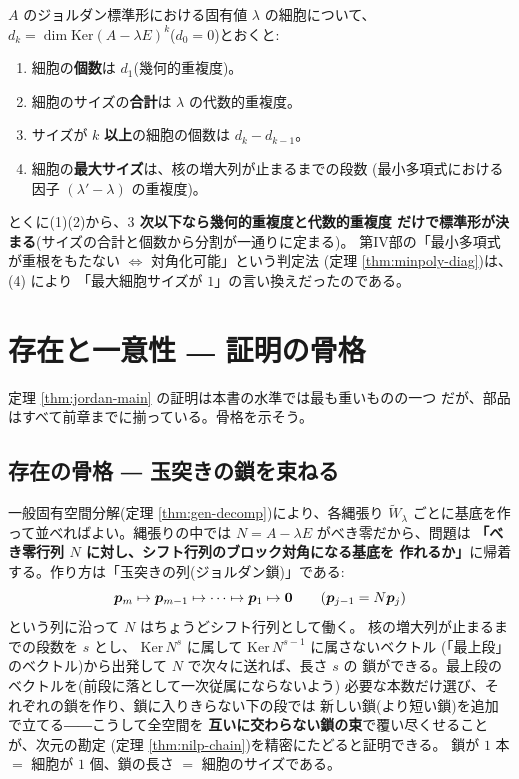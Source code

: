 \begin{teiri}[細胞の読み取り]\label{thm:jordan-count}
$A$ のジョルダン標準形における固有値 $\lambda$ の細胞について、
$d_k = \dim \mathrm{Ker}(A - \lambda E)^k$($d_0 = 0$)とおくと:
\begin{enumerate}
\item 細胞の\textbf{個数}は $d_1$(幾何的重複度)。
\item 細胞のサイズの\textbf{合計}は $\lambda$ の代数的重複度。
\item サイズが $k$ \textbf{以上}の細胞の個数は $d_k - d_{k-1}$。
\item 細胞の\textbf{最大サイズ}は、核の増大列が止まるまでの段数
(最小多項式における因子 $(\lambda' - \lambda)$ の重複度)。
\end{enumerate}
\end{teiri}

とくに(1)(2)から、\textbf{$3$ 次以下なら幾何的重複度と代数的重複度
だけで標準形が決まる}(サイズの合計と個数から分割が一通りに定まる)。
第IV部の「最小多項式が重根をもたない $\iff$ 対角化可能」という判定法
(定理 \ref{thm:minpoly-diag})は、(4) により
「最大細胞サイズが $1$」の言い換えだったのである。

\section{存在と一意性 ― 証明の骨格}

定理 \ref{thm:jordan-main} の証明は本書の水準では最も重いものの一つ
だが、部品はすべて前章までに揃っている。骨格を示そう。

\subsection*{存在の骨格 ― 玉突きの鎖を束ねる}

一般固有空間分解(定理 \ref{thm:gen-decomp})により、各縄張り
$\widetilde{W}_\lambda$ ごとに基底を作って並べればよい。縄張りの中では
$N = A - \lambda E$ がべき零だから、問題は
\textbf{「べき零行列 $N$ に対し、シフト行列のブロック対角になる基底を
作れるか」}に帰着する。作り方は「玉突きの列(ジョルダン鎖)」である:
\[
\bm{p}_m \mapsto \bm{p}_{m-1} \mapsto \cdots \mapsto \bm{p}_1 \mapsto \bm{0}
\qquad (\bm{p}_{j-1} = N\bm{p}_j)
\]
という列に沿って $N$ はちょうどシフト行列として働く。
核の増大列が止まるまでの段数を $s$ とし、
$\mathrm{Ker}\,N^s$ に属して $\mathrm{Ker}\,N^{s-1}$ に属さないベクトル
(「最上段」のベクトル)から出発して $N$ で次々に送れば、長さ $s$ の
鎖ができる。最上段のベクトルを(前段に落として一次従属にならないよう)
必要な本数だけ選び、それぞれの鎖を作り、鎖に入りきらない下の段では
新しい鎖(より短い鎖)を追加で立てる――こうして全空間を
\textbf{互いに交わらない鎖の束}で覆い尽くせることが、次元の勘定
(定理 \ref{thm:nilp-chain})を精密にたどると証明できる。
鎖が $1$ 本 $=$ 細胞が $1$ 個、鎖の長さ $=$ 細胞のサイズである。

